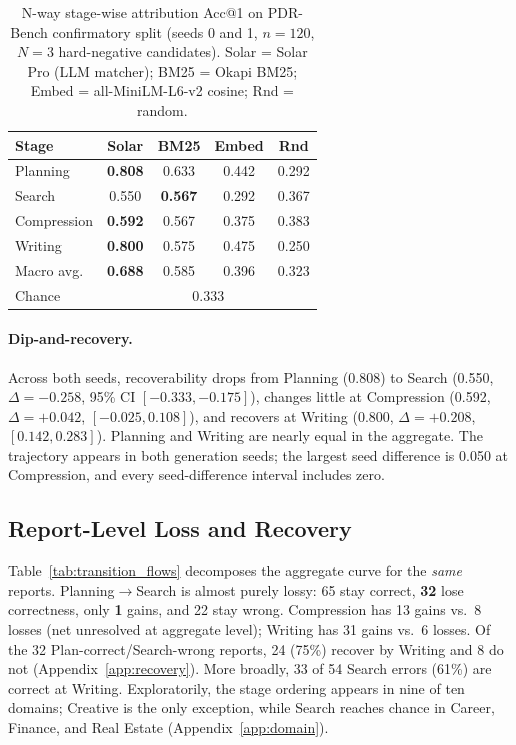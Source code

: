 \documentclass[]{article}
\begin{document}
\begin{table}[t]
\centering
\small
\begin{tabular}{lcccc}
\toprule
\textbf{Stage} & \textbf{Solar} & \textbf{BM25} & \textbf{Embed} & \textbf{Rnd} \\
\midrule
Planning    & \textbf{0.808} & 0.633 & 0.442 & 0.292 \\
Search      & 0.550 & \textbf{0.567} & 0.292 & 0.367 \\
Compression & \textbf{0.592} & 0.567 & 0.375 & 0.383 \\
Writing     & \textbf{0.800} & 0.575 & 0.475 & 0.250 \\
\midrule
Macro avg.  & \textbf{0.688} & 0.585 & 0.396 & 0.323 \\
Chance      & \multicolumn{4}{c}{0.333} \\
\bottomrule
\end{tabular}
\caption{N-way stage-wise attribution Acc@1 on PDR-Bench confirmatory
  split (seeds 0 and 1, $n=120$, $N=3$ hard-negative candidates).
  Solar = Solar Pro (LLM matcher);
  BM25 = Okapi BM25; Embed = all-MiniLM-L6-v2 cosine; Rnd = random.}
\label{tab:main_results}
\end{table}

\paragraph{Dip-and-recovery.}
Across both seeds, recoverability drops from Planning (0.808) to Search
(0.550, $\Delta=-0.258$, 95\% CI $[-0.333,-0.175]$), changes little at
Compression (0.592, $\Delta=+0.042$, $[-0.025,0.108]$), and recovers
at Writing (0.800, $\Delta=+0.208$, $[0.142,0.283]$).
Planning and Writing are nearly equal in the aggregate.
The trajectory appears in both generation seeds; the largest seed difference
is 0.050 at Compression, and every seed-difference interval includes zero.

\subsection{Report-Level Loss and Recovery}

Table~\ref{tab:transition_flows} decomposes the aggregate curve for the \emph{same} reports.
Planning$\rightarrow$Search is almost purely lossy: 65 stay correct, \textbf{32}
lose correctness, only \textbf{1} gains, and 22 stay wrong.
Compression has 13 gains vs.\ 8 losses (net unresolved at aggregate level);
Writing has 31 gains vs.\ 6 losses.
Of the 32 Plan-correct/Search-wrong reports, 24 (75\%) recover by Writing
and 8 do not (Appendix~\ref{app:recovery}).
More broadly, 33 of 54 Search errors (61\%) are correct at Writing.
Exploratorily, the stage ordering appears in nine of ten domains; Creative is
the only exception, while Search reaches chance in Career, Finance, and Real
Estate (Appendix~\ref{app:domain}).
\end{document}
